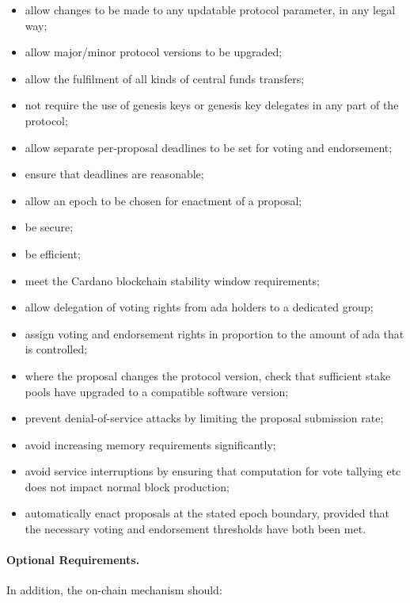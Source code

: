 \begin{itemize}
\item
  allow changes to be made to any updatable protocol parameter, in any legal way;
\item
  allow major/minor protocol versions to be upgraded;
\item
  allow the fulfilment of all kinds of central funds transfers;
\item
  not require the use of genesis keys or genesis key delegates in any part of the protocol;
\item
  allow separate per-proposal deadlines to be set for voting and endorsement;
\item
  ensure that deadlines are reasonable;
\item
  allow an epoch to be chosen for enactment of a proposal;
\item
  be secure;
\item
  be efficient;
\item
  meet the Cardano blockchain stability window requirements;
\item
  allow delegation of voting rights from ada holders to a dedicated group;
\item
  assign voting and endorsement rights in proportion to the amount of ada that is controlled;
\item
  where the proposal changes the protocol version, check that sufficient stake pools have upgraded to a compatible software version;
\item
  prevent denial-of-service attacks by limiting the proposal submission rate;
\item
  avoid increasing memory requirements significantly;
\item
  avoid service interruptions by ensuring that computation for vote tallying etc does not impact normal block production;
\item
  automatically enact proposals at the stated epoch boundary, provided that the necessary voting and endorsement thresholds have both been met.
\end{itemize}

\paragraph{Optional Requirements.}  In addition, the on-chain mechanism should:

